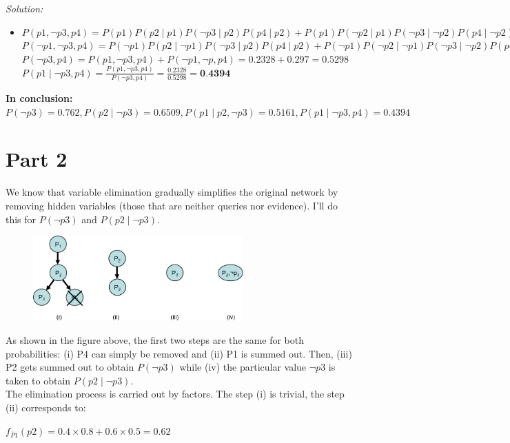 \documentclass[a4paper, 11pt]{article}
\newenvironment{solution}
    {\textit{Solution:}}
    {}
\begin{document}
{\begin{solution}
\begin{itemize}
		$P(p2, \neg p3) = P(p1, p2, \neg p3) + P(\neg p1, p , \neg p3) = 0.256 + 0.24 = 0.496$\\
		
		$P(p1 \mid p2, \neg p3) = \frac{P(p1, p2, \neg p3)}{P(p2, \neg p3)} = \frac{0.256}{0.496} = \textbf{0.5161}$
		\item $P(p1, \neg p3, p4) = P(p1)P(p2 \mid p1)P(\neg p3 \mid p2)P(p4 \mid p2) + P(p1)P(\neg p2 \mid p1)P(\neg p3 \mid \neg p2)P(p4 \mid \neg p2) = 0.4 \times 0.8 \times 0.8 \times 0.8 + 0.4 \times 0.2 \times 0.7 \times 0.5 = 0.2048 + 0.028 = 0.2328$\\
		
		$P(\neg p1, \neg p3, p4) = P(\neg p1)P(p2 \mid \neg p1)P(\neg p3 \mid p2)P(p4 \mid p2) + P(\neg p1)P(\neg p2 \mid \neg p1)P(\neg p3 \mid \neg p2)P(p4 \mid \neg p2) = 0.6 \times 0.5 \times 0.8 \times 0.8 + 0.6 \times 0.5 \times 0.7 \times 0.5 = 0.192 + 0.105 = 0.297$\\
		
		$P(\neg p3, p4) = P(p1, \neg p3, p4) + P(\neg p1, \neg p , p4) = 0.2328 + 0.297 = 0.5298$\\
		
		$P(p1 \mid \neg p3, p4) = \frac{P(p1, \neg p3, p4)}{P(\neg p3, p4)} = \frac{0.2328}{0.5298} = \textbf{0.4394}$
	\end{itemize}
	\textbf{In conclusion: $P(\neg p3) = 0.762, P(p2 \mid \neg p3) = 0.6509, P(p1 \mid p2, \neg p3) = 0.5161, P(p1 \mid \neg p3, p4) = 0.4394$}
	\pagebreak
	\section*{\small Part 2}
	We know that variable elimination gradually simplifies the original network by removing hidden variables (those that are neither queries nor evidence). I’ll do this for $P(\neg p3)$ and $P(p2 \mid \neg p3)$.\\
	\begin{figure}[H]
		\centering
		\includegraphics[width=0.72\textwidth]{4-1.jpg}
	\end{figure}
	As shown in the figure above, the first two steps are the same for both probabilities: (i) P4 can simply be removed and (ii) P1 is summed out. Then, (iii) P2 gets summed out to obtain $P(\neg p3)$ while (iv) the particular value $\neg p3$ is taken to obtain $P(p2 \mid \neg p3)$.\\
	The elimination process is carried out by factors. The step (i) is trivial, the step (ii) corresponds to:
	\begin{center}
		$f_{\overline P1}(p2) = 0.4 \times 0.8 + 0.6 \times 0.5 = 0.62$
		

\end{center}
\end{solution}}
\end{document}
